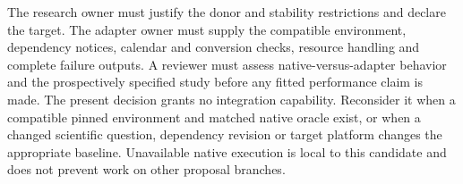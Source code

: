 The research owner must justify the donor and stability restrictions and
declare the target. The adapter owner must supply the compatible environment,
dependency notices, calendar and conversion checks, resource handling and
complete failure outputs. A reviewer must assess native-versus-adapter
behavior and the prospectively specified study before any fitted performance
claim is made. The present decision grants no integration capability.
Reconsider it when a compatible pinned environment and matched native oracle
exist, or when a changed scientific question, dependency revision or target
platform changes the appropriate baseline. Unavailable native execution is
local to this candidate and does not prevent work on other proposal branches.
\cite{exec13_ci_reuse}
\label{exec13:causalimpact-reuse-end}
